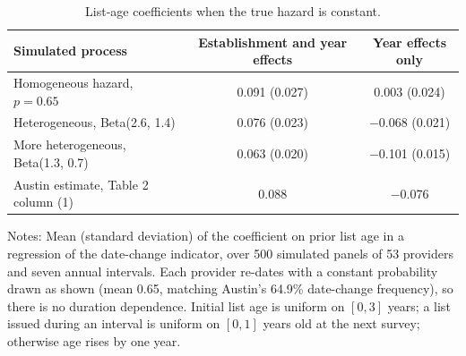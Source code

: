 \begin{table}[H]\centering\footnotesize
\caption{List-age coefficients when the true hazard is constant.}\label{tab:A5}
\begin{tabular*}{\textwidth}{@{\extracolsep{\fill}}lcc@{}}\toprule
Simulated process & Establishment and year effects & Year effects only \\\midrule
Homogeneous hazard, $p=0.65$ & 0.091 (0.027) & 0.003 (0.024) \\
Heterogeneous, Beta(2.6, 1.4) & 0.076 (0.023) & $-$0.068 (0.021) \\
More heterogeneous, Beta(1.3, 0.7) & 0.063 (0.020) & $-$0.101 (0.015) \\
Austin estimate, Table 2 column (1) & 0.088 & $-$0.076 \\
\bottomrule\end{tabular*}
\begin{minipage}{\textwidth}\vspace{3pt}\scriptsize Notes: Mean (standard deviation) of the coefficient on prior list age in a regression of the date-change indicator, over 500 simulated panels of 53 providers and seven annual intervals. Each provider re-dates with a constant probability drawn as shown (mean 0.65, matching Austin's 64.9\% date-change frequency), so there is no duration dependence. Initial list age is uniform on $[0,3]$ years; a list issued during an interval is uniform on $[0,1]$ years old at the next survey; otherwise age rises by one year.\end{minipage}
\end{table}
